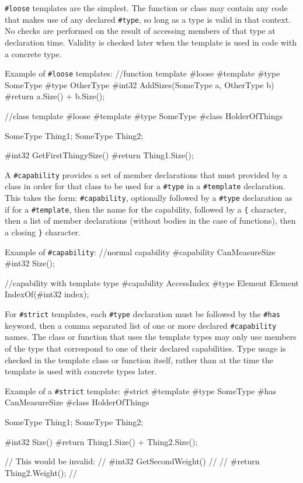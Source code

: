 \documentclass{article}
\newcommand{\code}[1]{\colorbox{light-gray}{\texttt{#1}}}
\newenvironment{codebox} {\snugshade\verbatim} {\endverbatim\endsnugshade}
\begin{document}
\code{\#loose} templates are the simplest.  The function or class may contain any code that makes use of any declared \code{\#type}, so long as a type is valid in that context.  No checks are performed on the result of accessing members of that type at declaration time.  Validity is checked later when the template is used in code with a concrete type.

Example of \code{\#loose} templates:
\begin{codebox}
//function template
#loose #template
#type SomeType
#type OtherType
#int32 AddSizes(SomeType a, OtherType b)
{
    #return a.Size() + b.Size();
}

//class template
#loose #template
#type SomeType
#class HolderOfThings
{
    SomeType Thing1;
    SomeType Thing2;
    
    #int32 GetFirstThingySize()
    {
        #return Thing1.Size();
    }
}
\end{codebox}

A \code{\#capability} provides a set of member declarations that must provided by a class in order for that class to be used for a \code{\#type} in a \code{\#template} declaration.  This takes the form: \code{\#capability}, optionally followed by a \code{\#type} declaration as if for a \code{\#template}, then the name for the capability, followed by a \code{\{} character, then a list of member declarations (without bodies in the case of functions), then a closing \code{\}} character.

Example of \code{\#capability}:
\begin{codebox}
//normal capability
#capability CanMeasureSize
{
    #int32 Size();
}

//capability with template type
#capability AccessIndex
#type Element
{
    Element IndexOf(#int32 index);
}
\end{codebox}

For \code{\#strict} templates, each \code{\#type} declaration must be followed by the \code{\#has} keyword, then a comma separated list of one or more declared \code{\#capability} names.  The class or function that uses the template types may only use members of the type that correspond to one of their declared capabilities.  Type usage is checked in the template class or function itself, rather than at the time the template is used with concrete types later.

Example of a \code{\#strict} template:
\begin{codebox}
#strict #template
#type SomeType #has CanMeasureSize
#class HolderOfThings
{
    SomeType Thing1;
    SomeType Thing2;
    
    #int32 Size()
    {
        #return Thing1.Size() + Thing2.Size();
    }
    
// This would be invalid:
//  #int32 GetSecondWeight()
//  {
//      #return Thing2.Weight();
//  }
}
\end{codebox}
\end{document}
